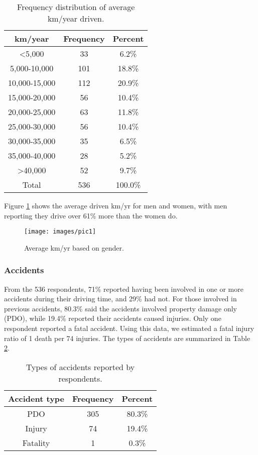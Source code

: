 \documentclass[preprint,12pt,a4paper,authoryear]{elsarticle}
\begin{document}
\begin{table}[H]
\centering
\caption{Frequency distribution of average km/year driven.}
\label{tab:annualkm}
\begin{tabular}{@{}ccc@{}}
\toprule
\textbf{km/year} & \textbf{Frequency} & \textbf{Percent} \\ \midrule
\textless5,000 & 33 & 6.2\% \\
5,000-10,000 & 101 & 18.8\% \\
10,000-15,000 & 112 & 20.9\% \\
15,000-20,000 & 56 & 10.4\% \\
20,000-25,000 & 63 & 11.8\% \\
25,000-30,000 & 56 & 10.4\% \\
30,000-35,000 & 35 & 6.5\% \\
35,000-40,000 & 28 & 5.2\% \\
\textgreater40,000 & 52 & 9.7\% \\
Total & 536 & 100.0\% \\ \bottomrule
\end{tabular}
\end{table}

Figure \ref{fig:avekmgender} shows the average driven km/yr for men and women, with men reporting they drive over 61\% more than the women do.
%
\begin{figure}[H]
\centering
\texttt{[image: images/pic1]}  %
\caption{Average km/yr based on gender.}
\label{fig:avekmgender}
\end{figure}
%

\subsubsection{Accidents}
From the 536 respondents, 71\% reported having been involved in one or more accidents during their driving time, and 29\% had not. For those involved in previous accidents, 80.3\%  said the accidents involved property damage only (PDO), while 19.4\% reported their accidents caused injuries. Only one respondent reported a fatal accident. Using this data, we estimated a fatal injury ratio of 1 death per 74 injuries. The types of accidents are summarized in Table \ref{tab:accidents}.

\begin{table}[H]
\centering
\caption{Types of accidents reported by respondents.}
\label{tab:accidents}
\begin{tabular}{@{}ccc@{}}
\toprule
\textbf{Accident type} & \textbf{Frequency} & \textbf{Percent} \\ \midrule
PDO & 305 & 80.3\% \\
Injury & 74 & 19.4\% \\
Fatality & 1 & 0.3\% \\ \bottomrule
\end{tabular}
\end{table}
\end{document}
